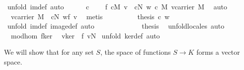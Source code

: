 \begin{isabellebody}
\ {\isacharparenleft}unfold\ im{\isacharunderscore}def{\isacharcomma}\ auto{\isacharparenright}\isanewline
\ \ \ \ \isamarkupfalse%
\ c\ {}{}\ \isamarkupfalse%
\ {}{}{\isacharcolon}\ {\isachardoublequoteopen}f\ {\isacharparenleft}c{\isasymodot}\isactrlbsub M\isactrlesub \ v{\isacharparenright}\ {\isacharequal}\ c{\isasymodot}\isactrlbsub N\isactrlesub \ w{\isasymand}\ {\isacharparenleft}c\ {\isasymodot}\isactrlbsub M\isactrlesub \ v{\isasymin}carrier\ M{\isacharparenright}{\isachardoublequoteclose}\ \isamarkupfalse%
\ auto\isanewline
\ \ \ \ \isamarkupfalse%
\ {}{}\ \isamarkupfalse%
\ {}{}{\isacharcolon}\ {\isachardoublequoteopen}{\isasymexists}v{}{\isasymin}carrier\ M{\isachardot}\ \ c{\isasymodot}\isactrlbsub N\isactrlesub \ w{\isacharequal}f\ v{}{\isachardoublequoteclose}\ \isamarkupfalse%
\ metis\ \isanewline
\ \ \ \ \isamarkupfalse%
\ {}{}\ \isamarkupfalse%
\ {\isachardoublequoteopen}{\isacharquery}thesis\ c\ w{\isachardoublequoteclose}\ \isamarkupfalse%
\ {\isacharparenleft}unfold\ im{\isacharunderscore}def\ image{\isacharunderscore}def{\isacharcomma}\ auto{\isacharparenright}\ \isanewline
\ \ \isamarkupfalse%
\isanewline
\ \ \isamarkupfalse%
\ {}\ {}\ {}\ {}\ \isamarkupfalse%
\ {\isacharquery}thesis\ \isamarkupfalse%
\ {\isacharparenleft}unfold{\isacharunderscore}locales{\isacharcomma}\ auto{\isacharparenright}\isanewline
{}\isamarkupfalse%
%
\endisatagproof
{\isafoldproof}%
%
\isadelimproof
\isanewline
%
\endisadelimproof
\isanewline
{}\isamarkupfalse%
\ {\isacharparenleft}\ mod{\isacharunderscore}hom{\isacharparenright}\ f{\isacharunderscore}ker{\isacharcolon}\isanewline
\ \ {\isachardoublequoteopen}v{\isasymin}ker\ {\isasymLongrightarrow}\ f\ v{\isacharequal}{\isasymzero}\isactrlbsub N\isactrlesub {\isachardoublequoteclose}\isanewline
%
\isadelimproof
%
\endisadelimproof
%
\isatagproof
{}\isamarkupfalse%
\ {\isacharparenleft}unfold\ ker{\isacharunderscore}def{\isacharcomma}\ auto{\isacharparenright}%
\endisatagproof
{\isafoldproof}%
%
\isadelimproof
\isanewline
%
\endisadelimproof
{}\isamarkupfalse%
%
\begin{isamarkuptext}%
We will show that for any set $S$, the space of functions $S\to K$ forms a vector space.%

\end{isamarkuptext}
\end{isabellebody}
